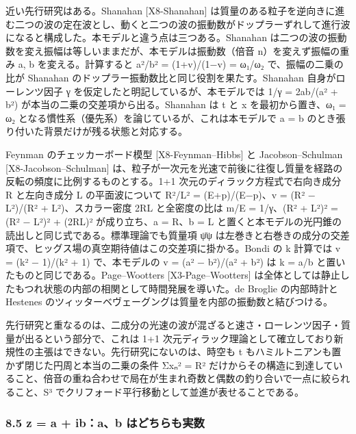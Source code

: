 \documentclass[
  a4paper,
]{ltjsarticle}
\begin{document}
近い先行研究はある。Shanahan {[}X8-Shanahan{]}
は質量のある粒子を逆向きに進む二つの波の定在波とし、動くと二つの波の振動数がドップラーずれして進行波になると構成した。本モデルと違う点は三つある。Shanahan
は二つの波の振動数を変え振幅は等しいままだが、本モデルは振動数（倍音
n）を変えず振幅の重み a, b を変える。計算すると a²/b² = (1+v)/(1−v) =
ω₁/ω₂ で、振幅の二乗の比が Shanahan
のドップラー振動数比と同じ役割を果たす。Shanahan 自身がローレンツ因子 γ
を仮定したと明記しているが、本モデルでは 1/γ = 2ab/(a² + b²)
が本当の二乗の交差項から出る。Shanahan は t と x を最初から置き、ω₁ = ω₂
となる慣性系（優先系）を論じているが、これは本モデルで a = b
のとき張り付いた背景だけが残る状態と対応する。

Feynman のチェッカーボード模型 {[}X8-Feynman--Hibbs{]} と
Jacobson--Schulman {[}X8-Jacobson--Schulman{]}
は、粒子が一次元を光速で前後に往復し質量を経路の反転の頻度に比例するものとする。1+1
次元のディラック方程式で右向き成分 R と左向き成分 L の平面波について
\textbar R\textbar²/\textbar L\textbar² = (E+p)/(E−p)、v =
(\textbar R\textbar² − \textbar L\textbar²)/(\textbar R\textbar² +
\textbar L\textbar²)、スカラー密度
2\textbar R\textbar\textbar L\textbar{} と全密度の比は m/E =
1/γ、(\textbar R\textbar² + \textbar L\textbar²)² = (\textbar R\textbar²
− \textbar L\textbar²)² + (2\textbar R\textbar\textbar L\textbar)²
が成り立ち、a = \textbar R\textbar、b = \textbar L\textbar{}
と置くと本モデルの光円錐の読出しと同じ式である。標準理論でも質量項 ψ̄ψ
は左巻きと右巻きの成分の交差項で、ヒッグス場の真空期待値はこの交差項に掛かる。Bondi
の k 計算では v = (k² − 1)/(k² + 1) で、本モデルの v = (a² − b²)/(a² +
b²) は k = a/b と置いたものと同じである。Page--Wootters
{[}X3-Page--Wootters{]}
は全体としては静止したもつれ状態の内部の相関として時間発展を導いた。de
Broglie の内部時計と Hestenes
のツィッターベヴェーグングは質量を内部の振動数と結びつける。

先行研究と重なるのは、二成分の光速の波が混ざると速さ・ローレンツ因子・質量が出るという部分で、これは
1+1
次元ディラック理論として確立しており新規性の主張はできない。先行研究にないのは、時空も
t もハミルトニアンも置かず閉じた円周と本当の二乗の条件 Σxₙ² = R²
だけからその構造に到達していること、倍音の重ね合わせで局在が生まれ奇数と偶数の釣り合いで一点に絞られること、S³
でクリフォード平行移動として並進が表せることである。

\subsubsection{8.5 z = a + ib：a、b
はどちらも実数}\label{z-a-ibab-ux306fux3069ux3061ux3089ux3082ux5b9fux6570}
\end{document}
